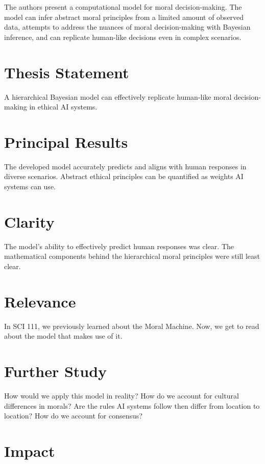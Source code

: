 \documentclass[12pt, letterpaper]{article}
\begin{document}
The authors present a computational model for moral decision-making. The model can infer abstract moral principles from a limited amount of observed data, attempts to address the nuances of moral decision-making with Bayesian inference, and can replicate human-like decisions even in complex scenarios.

\section{Thesis Statement}
\label{sec:thesis}

A hierarchical Bayesian model can effectively replicate human-like moral decision-making in ethical AI systems.

\section{Principal Results}
\label{sec:principal}

The developed model accurately predicts and aligns with human responses in diverse scenarios. Abstract ethical principles can be quantified as weights AI systems can use.

\section{Clarity}
\label{sec:clarity}

The model's ability to effectively predict human responses was clear. The mathematical components behind the hierarchical moral principles were still least clear.

\section{Relevance}
\label{sec:relevance}

In SCI 111, we previously learned about the Moral Machine. Now, we get to read about the model that makes use of it.

\section{Further Study}
\label{sec:further}

How would we apply this model in reality? How do we account for cultural differences in morals? Are the rules AI systems follow then differ from location to location? How do we account for consensus?

\section{Impact}
\label{sec:impact}
\end{document}
